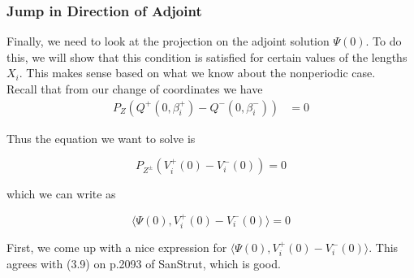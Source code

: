 \documentclass[thesis.tex]{subfiles}
\begin{document}
\subsubsection{Jump in Direction of Adjoint}

Finally, we need to look at the projection on the adjoint solution $\Psi(0)$. To do this, we will show that this condition is satisfied for certain values of the lengths $X_i$. This makes sense based on what we know about the nonperiodic case.\\

Recall that from our change of coordinates we have
\begin{align*}
P_{Z}(Q^+(0, \beta_i^+) - Q^-(0, \beta_i^-)) &= 0
\end{align*}

Thus the equation we want to solve is

\begin{equation}
P_{Z^\pm}(V_i^+(0) - V_i^-(0)) = 0
\end{equation}

which we can write as

\begin{equation}
\langle \Psi(0), V_i^+(0) - V_i^-(0) \rangle = 0
\end{equation}

First, we come up with a nice expression for $\langle \Psi(0), V_i^+(0) - V_i^-(0) \rangle$. This agrees with (3.9) on p.2093 of SanStrut, which is good.

\end{document}
